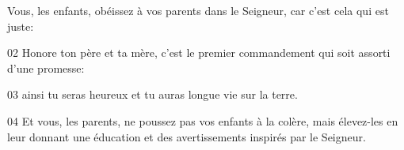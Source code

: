 Vous, les enfants, obéissez à vos parents dans le Seigneur, car c’est cela qui est juste:

02 Honore ton père et ta mère, c’est le premier commandement qui soit assorti d’une promesse:

03 ainsi tu seras heureux et tu auras longue vie sur la terre.

04 Et vous, les parents, ne poussez pas vos enfants à la colère, mais élevez-les en leur donnant une éducation et des avertissements inspirés par le Seigneur.
